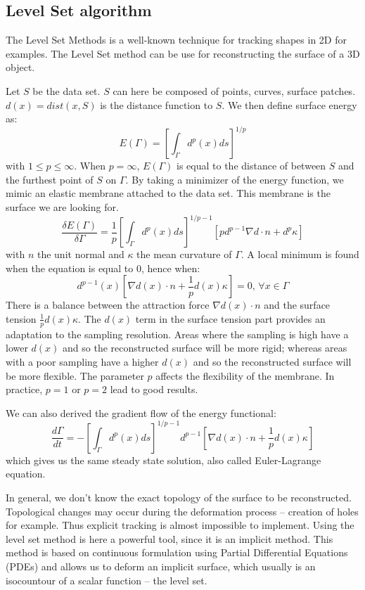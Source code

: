 \documentclass[a4paper]{article}
\begin{document}
\subsection{Level Set algorithm}
The Level Set Methods is a well-known technique for tracking shapes in 2D for examples. The Level Set method can be use for reconstructing the surface of a 3D object.

Let $S$ be the data set. $S$ can here be composed of points, curves, surface patches. $d(x) = dist(x,S)$ is the distance function to $S$. We then define surface energy as:
$$E(\Gamma) = \left[\int_{\Gamma} d^p(x)ds\right]^{1/p}$$
with $1 \le p \le \infty$. When $p = \infty$, $E(\Gamma)$ is equal to the distance of between $S$ and the furthest point of $S$ on $\Gamma$. By taking a minimizer of the energy function, we mimic an elastic membrane attached to the data set. This membrane is the surface we are looking for.
$$\frac{\delta E(\Gamma)}{\delta\Gamma} = \frac{1}{p}\left[\int_{\Gamma} d^p(x)ds\right]^{1/p - 1}[pd^{p-1}\nabla d \cdot n +d^p\kappa]$$
with $n$ the unit normal and $\kappa$ the mean curvature of $\Gamma$. A local minimum is found when the equation is equal to 0, hence when:
$$d^{p-1}(x)[\nabla d(x) \cdot n + \frac{1}{p}d(x)\kappa] = 0\text{, }\forall x\in\Gamma$$
There is a balance between the attraction force $\nabla d(x) \cdot n$ and the surface tension $\frac{1}{p}d(x)\kappa$. The $d(x)$ term in the surface tension part provides an adaptation to the sampling resolution. Areas where the sampling is high have a lower $d(x)$ and so the reconstructed surface will be more rigid; whereas areas with a poor sampling have a higher $d(x)$ and so the reconstructed surface will be more flexible. The parameter $p$ affects the flexibility of the membrane. In practice, $p = 1$ or $p = 2$ lead to good results.

We can also derived the gradient flow of the energy functional:
$$\frac{d\Gamma}{dt} = -\left[\int_{\Gamma} d^p(x)ds\right]^{1/p - 1}d^{p-1}[\nabla d(x) \cdot n +\frac{1}{p}d(x)\kappa]$$
which gives us the same steady state solution, also called Euler-Lagrange equation.

In general, we don't know the exact topology of the surface to be reconstructed. Topological changes may occur during the deformation process -- creation of holes for example. Thus explicit tracking is almost impossible to implement. Using the level set method is here a powerful tool, since it is an implicit method. This method is based on continuous formulation using Partial Differential Equations (PDEs) and allows us to deform an implicit surface, which usually is an isocountour of a scalar function -- the level set.
\end{document}
